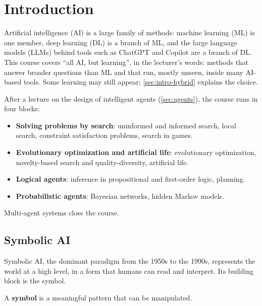 \section{Introduction}\label{sec:introduction}

Artificial intelligence (AI) is a large family of methods: machine learning
(ML) is one member, deep learning (DL) is a branch of ML, and the large language
models (LLMs) behind tools such as ChatGPT and Copilot are a branch of DL. This
course covers ``all AI, but learning'', in the lecturer's words: methods that
answer broader questions than ML and that run, mostly unseen, inside many
AI-based tools. Some learning may still appear; \cref{sec:intro-hybrid}
explains the choice.

After a lecture on the design of intelligent agents (\cref{sec:agents}), the
course runs in four blocks:
\begin{itemize}
  \item \textbf{Solving problems by search}: uninformed and informed search,
    local search, constraint satisfaction problems, search in games.
  \item \textbf{Evolutionary optimization and artificial life}: evolutionary
    optimization, novelty-based search and quality-diversity, artificial life.
  \item \textbf{Logical agents}: inference in propositional and first-order
    logic, planning.
  \item \textbf{Probabilistic agents}: Bayesian networks, hidden Markov models.
\end{itemize}
Multi-agent systems close the course.

\subsection{Symbolic AI}\label{sec:intro-symbolic}

Symbolic AI, the dominant paradigm from the 1950s to the 1990s, represents the
world at a high level, in a form that humans can read and interpret. Its
building block is the symbol.

\begin{definition}[Symbol]\label{def:symbol}
  A \textbf{symbol} is a meaningful pattern that can be manipulated.
\end{definition}

